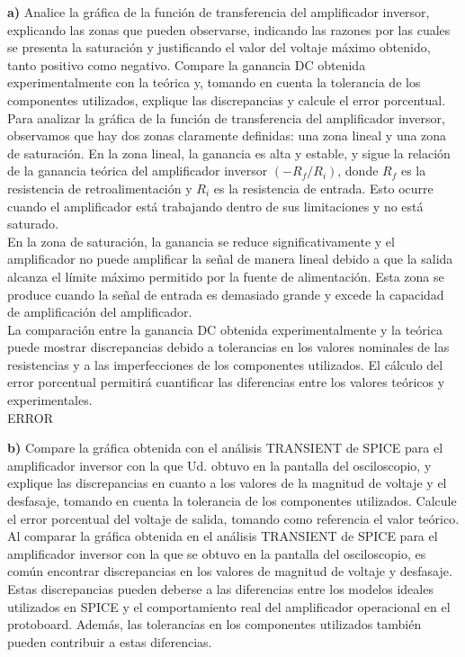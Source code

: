 \documentclass[12pt]{article}
\begin{document}
	\noindent \textbf{a)} Analice la gráfica de la función de transferencia del amplificador inversor, explicando las zonas que pueden observarse, indicando las razones por las cuales se presenta la saturación y justificando el valor del voltaje máximo obtenido, tanto positivo como	negativo. Compare la ganancia DC obtenida experimentalmente con la teórica y, tomando en cuenta la tolerancia de los componentes utilizados, explique las discrepancias y calcule el error porcentual.\\
	
	Para analizar la gráfica de la función de transferencia del amplificador inversor, observamos que hay dos zonas claramente definidas: una zona lineal y una zona de saturación. En la zona lineal, la ganancia es alta y estable, y sigue la relación de la ganancia teórica del amplificador inversor $(-R_{f}/R_{i})$, donde $R_{f}$ es la resistencia de retroalimentación y $R_{i}$ es la resistencia de entrada. Esto ocurre cuando el amplificador está trabajando dentro de sus limitaciones y no está saturado.\\
	
	En la zona de saturación, la ganancia se reduce significativamente y el amplificador no puede amplificar la señal de manera lineal debido a que la salida alcanza el límite máximo permitido por la fuente de alimentación. Esta zona se produce cuando la señal de entrada es demasiado grande y excede la capacidad de amplificación del amplificador.\\
	
	La comparación entre la ganancia DC obtenida experimentalmente y la teórica puede mostrar discrepancias debido a tolerancias en los valores nominales de las resistencias y a las imperfecciones de los componentes utilizados. El cálculo del error porcentual permitirá cuantificar las diferencias entre los valores teóricos y experimentales.\\
	
	ERROR
	
	\noindent \textbf{b)} Compare la gráfica obtenida con el análisis TRANSIENT de SPICE para el amplificador inversor con la que Ud. obtuvo en la pantalla del osciloscopio, y explique las discrepancias en cuanto a los valores de la magnitud de voltaje y el desfasaje,	tomando en cuenta la tolerancia de los componentes utilizados. Calcule el error porcentual del voltaje de salida, tomando como referencia el valor teórico.\\
	
	Al comparar la gráfica obtenida en el análisis TRANSIENT de SPICE para el amplificador inversor con la que se obtuvo en la pantalla del osciloscopio, es común encontrar discrepancias en los valores de magnitud de voltaje y desfasaje. Estas discrepancias pueden deberse a las diferencias entre los modelos ideales utilizados en SPICE y el comportamiento real del amplificador operacional en el protoboard. Además, las tolerancias en los componentes utilizados también pueden contribuir a estas diferencias.\\
	
\end{document}
